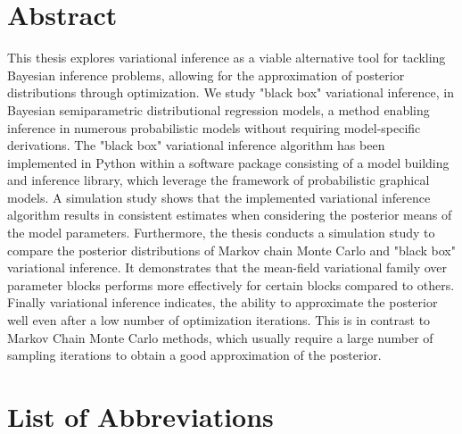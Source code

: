 \clearpage
{}


\section*{Abstract}

This thesis explores variational inference as a viable alternative tool for 
tackling Bayesian inference problems, 
allowing for the approximation of posterior distributions through optimization. 
We study "black box" variational inference, in Bayesian semiparametric distributional regression models,
a method enabling inference in numerous probabilistic models without requiring model-specific derivations.
The "black box" variational inference algorithm has been implemented in Python 
within a software package consisting of a model building and inference library, 
which leverage the framework of probabilistic graphical models.
A simulation study shows that the implemented variational inference algorithm results in 
consistent estimates when considering the posterior means of the model parameters. 
Furthermore, the thesis conducts a simulation study to compare the posterior distributions 
of Markov chain Monte Carlo and "black box" variational inference. It demonstrates that 
the mean-field variational family over parameter blocks performs more effectively for certain blocks compared to others.
Finally variational inference indicates, the ability to 
approximate the posterior well even after a low number of optimization iterations. 
This is in contrast to Markov Chain Monte Carlo methods, which usually require a 
large number of sampling iterations to obtain a good approximation of the posterior.

\clearpage

\setcounter{tocdepth}{2}
\tableofcontents
\clearpage

\listoffigures

\listofalgorithms 

\listoftables

\section*{List of Abbreviations}

